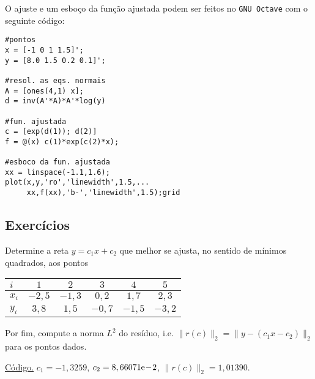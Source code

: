 \begin{ex}
\ifisoctave
O ajuste e um esboço da função ajustada podem ser feitos no \verb+GNU Octave+ com o seguinte código:
\begin{verbatim}
#pontos
x = [-1 0 1 1.5]';
y = [8.0 1.5 0.2 0.1]';

#resol. as eqs. normais
A = [ones(4,1) x];
d = inv(A'*A)*A'*log(y)

#fun. ajustada
c = [exp(d(1)); d(2)]
f = @(x) c(1)*exp(c(2)*x);

#esboco da fun. ajustada
xx = linspace(-1.1,1.6);
plot(x,y,'ro','linewidth',1.5,...
     xx,f(xx),'b-','linewidth',1.5);grid
\end{verbatim}
\fi

\end{ex}

\subsection*{Exercícios}

\begin{exer}\label{exer:mq_reta}
  Determine a reta $y = c_1x + c_2$ que melhor se ajusta, no sentido de mínimos quadrados, aos pontos
  \begin{center}
    \begin{tabular}{l|ccccc}
      $i$ & $1$ & $2$ & $3$ & $4$ & $5$ \\\hline
      $x_i$ & $-2,5$ & $-1,3$ & $0,2$ & $1,7$ & $2,3$\\
      $y_i$ & $3,8$ & $1,5$ & $-0,7$ & $-1,5$ & $-3,2$\\\hline
    \end{tabular}
  \end{center}
Por fim, compute a norma $L^2$ do resíduo, i.e. $\|r(c)\|_2 = \|y - (c_1x - c_2)\|_2$ para os pontos dados.
\end{exer}
\begin{resp}
  \ifisoctave 
  \href{https://github.com/phkonzen/notas/blob/master/src/MatematicaNumerica/cap_ajuste/dados/exer_mq_reta/exer_mq_reta.m}{Código.} 
  \fi
  $c_1 = -1,3259$, $c_2 = 8,66071\mathrm{e}\!-\!2$, $\|r(c)\|_2 = 1,01390$.
\end{resp}

